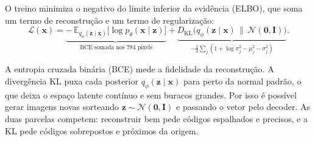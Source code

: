 \documentclass[11pt,a4paper]{article}
\begin{document}
O treino minimiza o negativo do limite inferior da evidência (ELBO), que soma um termo de reconstrução e um termo de regularização:
\begin{equation}
    \mathcal{L}(\mathbf{x}) = \underbrace{-\,\mathbb{E}_{q_\phi(\mathbf{z}\mid\mathbf{x})}\big[\log p_\theta(\mathbf{x} \mid \mathbf{z})\big]}_{\text{BCE somada nos 784 pixels}} + \underbrace{D_{\mathrm{KL}}\big(q_\phi(\mathbf{z} \mid \mathbf{x}) \,\|\, \mathcal{N}(\mathbf{0}, \mathbf{I})\big)}_{-\frac{1}{2}\sum_j \left(1 + \log\sigma_j^2 - \mu_j^2 - \sigma_j^2\right)}.
\end{equation}

A entropia cruzada binária (BCE) mede a fidelidade da reconstrução. A divergência KL puxa cada posterior $q_\phi(\mathbf{z}\mid\mathbf{x})$ para perto da normal padrão, o que deixa o espaço latente contínuo e sem buracos grandes. Por isso é possível gerar imagens novas sorteando $\mathbf{z} \sim \mathcal{N}(\mathbf{0}, \mathbf{I})$ e passando o vetor pelo decoder. As duas parcelas competem: reconstruir bem pede códigos espalhados e precisos, e a KL pede códigos sobrepostos e próximos da origem.
\end{document}
